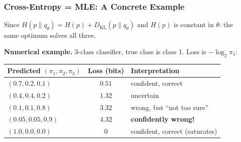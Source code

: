 \documentclass[aspectratio=169]{beamer}
\begin{document}
\begin{frame}
\frametitle{Cross-Entropy = MLE: A Concrete Example}

\small
Since $H(p\|q_\theta) = H(p) + D_{\text{KL}}(p\|q_\theta)$ and $H(p)$ is constant in $\theta$:
the same optimum solves all three.

\vspace{0.1cm}
\begin{center}
\end{center}

\vspace{0.05cm}
\textbf{Numerical example.} 3-class classifier, true class is class 1. Loss is $-\log_2 \pi_1$:

\vspace{0.05cm}
\begin{center}
\footnotesize
\renewcommand{\arraystretch}{1.2}
\begin{tabular}{lcl}
  \textbf{Predicted} $(\pi_1, \pi_2, \pi_3)$ & \textbf{Loss (bits)} & \textbf{Interpretation} \\
  \hline
  $(0.7, 0.2, 0.1)$    & $0.51$ & confident, correct \\
  $(0.4, 0.4, 0.2)$    & $1.32$ & uncertain \\
  $(0.1, 0.1, 0.8)$    & $3.32$ & wrong, but ``not too sure'' \\
  $(0.05, 0.05, 0.9)$  & $4.32$ & \textcolor{sampred}{\textbf{confidently wrong!}} \\
  $(1.0, 0.0, 0.0)$    & $0$    & confident, correct (saturates) \\
  \hline
\end{tabular}
\end{center}

\vspace{0.1cm}
\begin{center}
\end{center}
\end{frame}
\end{document}
